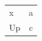 \documentclass{article}
\begin{document}
\begin{tabular}{lc}
x & a \\
\multirow{-2}{*}{Up} & c \\
\end{tabular}
\end{document}
